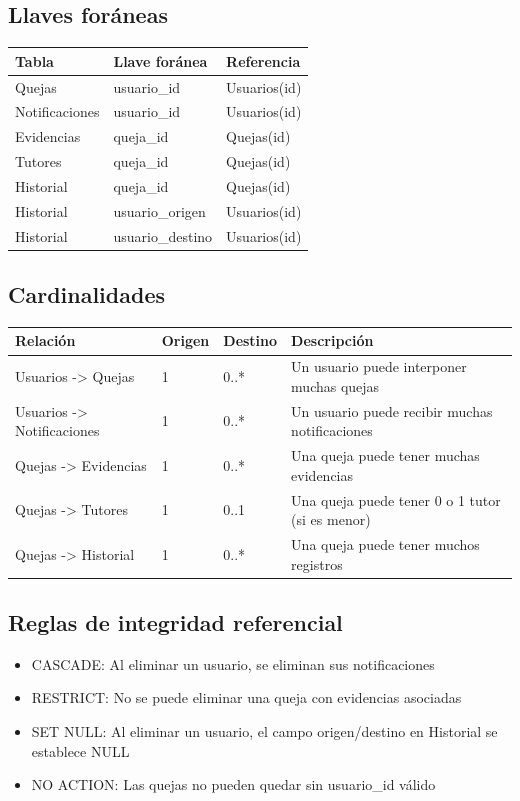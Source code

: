 \documentclass[11pt,letterpaper]{article}
\begin{document}
\subsection{Llaves foráneas}
\begin{longtable}{|p{4cm}|p{4cm}|p{6cm}|}
\hline
\rowcolor{lightgray} \textbf{Tabla} & \textbf{Llave foránea} & \textbf{Referencia} \\
\hline
Quejas & usuario\_id & Usuarios(id) \\
\hline
Notificaciones & usuario\_id & Usuarios(id) \\
\hline
Evidencias & queja\_id & Quejas(id) \\
\hline
Tutores & queja\_id & Quejas(id) \\
\hline
Historial & queja\_id & Quejas(id) \\
\hline
Historial & usuario\_origen & Usuarios(id) \\
\hline
Historial & usuario\_destino & Usuarios(id) \\
\hline
\end{longtable}

\subsection{Cardinalidades}
\begin{longtable}{|p{4cm}|p{3cm}|p{3cm}|p{4cm}|}
\hline
\rowcolor{lightgray} \textbf{Relación} & \textbf{Origen} & \textbf{Destino} & \textbf{Descripción} \\
\hline
Usuarios -> Quejas & 1 & 0..* & Un usuario puede interponer muchas quejas \\
\hline
Usuarios -> Notificaciones & 1 & 0..* & Un usuario puede recibir muchas notificaciones \\
\hline
Quejas -> Evidencias & 1 & 0..* & Una queja puede tener muchas evidencias \\
\hline
Quejas -> Tutores & 1 & 0..1 & Una queja puede tener 0 o 1 tutor (si es menor) \\
\hline
Quejas -> Historial & 1 & 0..* & Una queja puede tener muchos registros \\
\hline
\end{longtable}

\subsection{Reglas de integridad referencial}
\begin{itemize}
\item CASCADE: Al eliminar un usuario, se eliminan sus notificaciones
\item RESTRICT: No se puede eliminar una queja con evidencias asociadas
\item SET NULL: Al eliminar un usuario, el campo origen/destino en Historial se establece NULL
\item NO ACTION: Las quejas no pueden quedar sin usuario\_id válido
\end{itemize}
\end{document}
